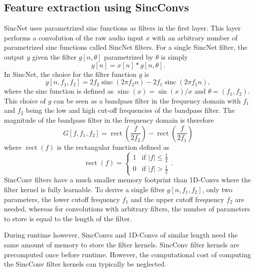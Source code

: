 \documentclass[a4paper]{article}
\DeclareMathOperator{\sinc}{sinc}
\DeclareMathOperator{\rect}{rect}
\begin{document}
\subsection{Feature extraction using SincConvs}
SincNet \cite{Ravanelli2018} uses parametrized sinc functions as filters in the first layer. This layer performs a convolution of the raw audio input $x$ with an arbitrary number of parametrized sinc functions called SincNet filters. For a single SincNet filter, the output $y$ given the filter $g[n, \theta]$ parametrized by $\theta$ is simply
\begin{equation}
	y[n] = x[n] * g[n, \theta].
\end{equation}
In SincNet, the choice for the filter function $g$ is
\begin{equation}
	g[n, f_1, f_2] = 2f_2 \sinc(2\pi f_2 n) - 2f_1 \sinc(2\pi f_1 n),
\end{equation}
where the sinc function is defined as $\sinc(x) = \sin(x) / x$ and $\theta = (f_1, f_2)$. This choice of $g$ can be seen as a bandpass filter in the frequency domain with $f_1$ and $f_2$ being the low and high cut-off frequencies of the bandpass filter. The magnitude of the bandpass filter in the frequency domain is therefore
\begin{equation}
	G[f, f_1, f_2] = \rect\left(\frac{f}{2 f_2}\right) - \rect\left(\frac{f}{2 f_1}\right)
\end{equation}
where $\rect(f)$ is the rectangular function defined as
\begin{equation}
	\rect(f) = \begin{cases} 1 &\mbox{if } |f| \leq \frac{1}{2} \\
		0 & \mbox{if } |f| > \frac{1}{2} \end{cases}.
\end{equation}
SincConv filters have a much smaller memory footprint than 1D-Convs where the filter kernel is fully learnable. To derive a single filter $g[n, f_1, f_2]$, only two parameters, the lower cutoff frequency $f_1$ and the upper cutoff frequency $f_2$ are needed, whereas for convolutions with arbitrary filters, the number of parameters to store is equal to the length of the filter.

During runtime however, SincConvs and 1D-Convs of similar length need the same amount of memory to store the filter kernels. SincConv filter kernels are precomputed once before runtime. However, the computational cost of computing the SincConv filter kernels can typically be neglected.
\end{document}
